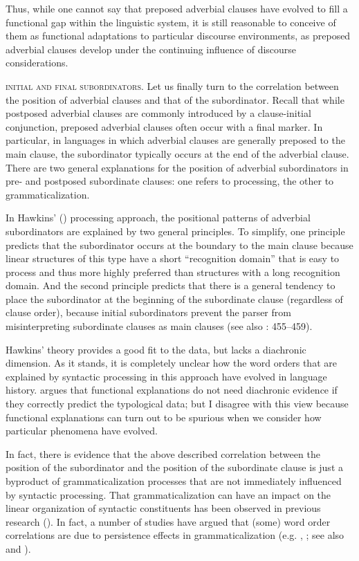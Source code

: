 \documentclass[output=paper]{langsci/langscibook}
\begin{document}
Thus, while one cannot say that preposed adverbial clauses have evolved to fill a functional gap within the linguistic system, it is still reasonable to conceive of them as functional adaptations to particular discourse environments, as preposed adverbial clauses develop under the continuing influence of discourse considerations.

\textsc{initial} \textsc{and} \textsc{final} \textsc{subordinators}. Let us finally turn to the correlation between the position of adverbial clauses and that of the subordinator. Recall that while postposed adverbial clauses are commonly introduced by a clause-initial conjunction, preposed adverbial clauses often occur with a final marker. In particular, in languages in which adverbial clauses are generally preposed to the main clause, the subordinator typically occurs at the end of the adverbial clause. There are two general explanations for the position of adverbial subordinators in pre- and postposed subordinate clauses: one refers to processing, the other to grammaticalization.

In Hawkins’ (\citeyear{Hawkins1994,Hawkins2004}) processing approach, the positional patterns of adverbial subordinators are explained by two general principles. To simplify, one principle predicts that the subordinator occurs at the boundary to the main clause because linear structures of this type have a short “recognition domain” that is easy to process and thus more highly preferred than structures with a long recognition domain. And the second principle predicts that there is a general tendency to place the subordinator at the beginning of the subordinate clause (regardless of clause order), because initial subordinators prevent the parser from misinterpreting subordinate clauses as main clauses (see also \citealt{Diessel2005}: 455--459).

Hawkins’ theory provides a good fit to the data, but lacks a diachronic dimension. As it stands, it is completely unclear how the word orders that are explained by syntactic processing in this approach have evolved in language history.  argues that functional explanations do not need diachronic evidence if they correctly predict the typological data; but I disagree with this view because functional explanations can turn out to be spurious when we consider how particular phenomena have evolved.

In fact, there is evidence that the above described correlation between the position of the subordinator and the position of the subordinate clause is just a byproduct of grammaticalization processes that are not immediately influenced by syntactic processing. That grammaticalization can have an impact on the linear organization of syntactic constituents has been observed in previous research (\citealt{LiThompson1974}). In fact, a number of studies have argued that (some) word order correlations are due to persistence effects in grammaticalization (e.g. \citealt{Givón1975}, \citealt{Aristar1991,Bybee2010,Collins2012}; see also  and ). 
\end{document}
